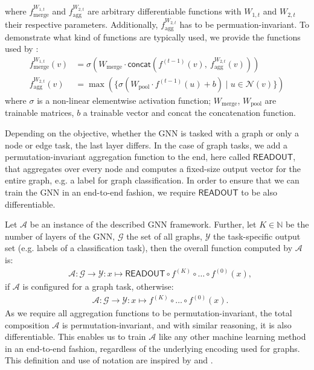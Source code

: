\documentclass[11pt, dvipsnames, DIV=12]{scrreprt}
\theoremstyle{definition}
\begin{document}
\noindent where $f^{W_{1,t}}_{\text{merge}}$ and $f^{W_{2,t}}_{\text{agg}}$ are arbitrary differentiable functions with $W_{1,t}$ and $W_{2,t}$ their respective parameters. Additionally, $f^{W_{2,t}}_{\text{agg}}$ has to be permuation-invariant. To demonstrate what kind of functions are typically used, we provide the functions used by \cite{Ham+2017}:
\begin{align*}
    f^{W_{1,t}}_{\text{merge}}(v) &= \sigma (W_{\text{merge}} \cdot \textsf{concat}(f^{(t-1)}(v), \ f^{W_{2,t}}_{\text{agg}}(v)))\\
    f^{W_{2,t}}_{\text{agg}}(v) &= \max(\{ \sigma(W_{\text{pool}} \cdot f^{(t-1)}(u) + b) \mid u \in \mathcal{N}(v)\})
\end{align*}
\noindent where $\sigma$ is a non-linear elementwise activation function; $W_{\text{merge}}$, $W_{\text{pool}}$ are trainable matrices, $b$ a trainable vector and \textsf{concat} the concatenation function.

Depending on the objective, whether the GNN is tasked with a graph or only a node or edge task, the last layer differs. In the case of graph tasks, we add a permutation-invariant aggregation function to the end, here called $\textsf{READOUT}$, that aggregates over every node and computes a fixed-size output vector for the entire graph, e.g. a label for graph classification. In order to ensure that we can train the GNN in an end-to-end fashion, we require $\textsf{READOUT}$ to be also differentiable.

Let $\mathcal{A}$ be an instance of the described GNN framework. Further, let $K \in \mathbb{N}$ be the number of layers of the GNN, $\mathcal{G}$ the set of all graphs, $\mathcal{Y}$ the task-specific output set (e.g. labels of a classification task), then the overall function computed by $\mathcal{A}$ is:
\begin{align*}
    &\mathcal{A}: \mathcal{G} \rightarrow \mathcal{Y}: x \mapsto \textsf{READOUT} \circ f^{(K)} \circ \ldots \circ f^{(0)}(x),
\end{align*}
if $\mathcal{A}$ is configured for a graph task, otherwise:
\begin{align*}
    &\mathcal{A}: \mathcal{G} \rightarrow \mathcal{Y}: x \mapsto f^{(K)} \circ \ldots \circ f^{(0)}(x).
\end{align*}
As we require all aggregation functions to be permutation-invariant, the total composition $\mathcal{A}$ is permutation-invariant, and with similar reasoning, it is also differentiable. This enables us to train $\mathcal{A}$ like any other machine learning method in an end-to-end fashion, regardless of the underlying encoding used for graphs. This definition and use of notation are inspired by \cite{Morris2018} and \cite{Xu2018}.
\end{document}
